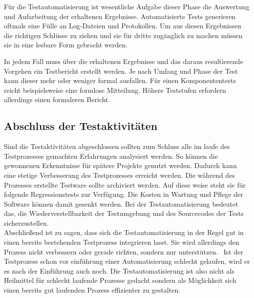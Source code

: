 Für die Testautomatisierung ist wesentliche Aufgabe dieser Phase die Auswertung und Aufarbeitung der erhaltenen Ergebnisse. Automatisierte Tests generieren oftmals eine Fülle an Log-Dateien und Protokollen. Um aus diesen Ergebnissen die richtigen Schlüsse zu ziehen und sie für dritte zugänglich zu machen müssen sie in eine lesbare Form gebracht werden.

In jedem Fall muss über die erhaltenen Ergebnisse und das daraus resultierende Vorgehen ein Testbericht erstellt werden. Je nach Umfang und Phase der Test kann dieser mehr oder weniger formal ausfallen. Für einen Komponententests reicht beispielsweise eine formlose Mitteilung. Höhere Teststufen erfordern allerdings einen formaleren Bericht.



\subsection{Abschluss der Testaktivitäten}
\label{subsec:abschluss_der_testaktivitäten}
Sind die Testaktivitäten abgeschlossen sollten zum Schluss alle im laufe des Testprozesses gemachten Erfahrungen analysiert werden. So können die gewonnenen Erkenntnisse für spätere Projekte genutzt werden. Dadurch kann eine stetige Verbesserung des Testprozesses erreicht werden.
Die während des Prozesses erstellte Testware sollte archiviert werden. Auf diese weise steht sie für folgende Regressionstests zur Verfügung. Die Kosten in Wartung und Pflege der Software können damit gesenkt werden.
Bei der Testautomatisierung bedeutet das, die Wiederverstellbarkeit der Testumgebung und des Sourcecodes der Tests sicherzustellen.
\newline\\
Abschließend ist zu sagen, dass sich die Testautomatisierung in der Regel gut in einen bereits bestehenden Testprozess integrieren lasst. Sie wird allerdings \glqq den Prozess nicht verbessern oder gerade richten, sondern nur unterstützen.\grqq\ \cite[S.21]{seidl_basiswissen_2012} Ist der Testprozess schon vor einführung einer Automatisierung schlecht gelaufen, wird er es nach der Einführung auch noch.
Die Testautomatisierung ist also nicht als Heilmittel für schlecht laufende Prozesse gedacht sondern als Möglichkeit sich einen bereits gut laufenden Prozess effizienter zu gestalten.

